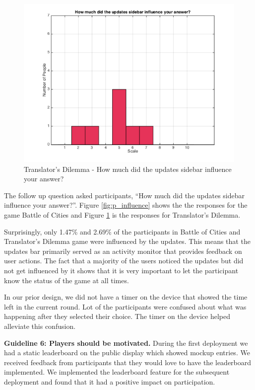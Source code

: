 \documentclass{sig-alternate}
\begin{document}
\begin{figure}
	\includegraphics[width=\linewidth]{t_influence.png}
	\caption{Translator's Dilemma - How much did the updates sidebar influence your answer?}
	\label{fig:t_influence}
\end{figure}

The follow up question asked participants, ``How much did the updates sidebar influence your answer?''. Figure \ref{fig:p_influence} shows the the responses for the game Battle of Cities and Figure \ref{fig:t_influence} is the responses for Translator's Dilemma.

Surprisingly, only 1.47\% and 2.69\% of the participants in Battle of Cities and Translator's Dilemma game were influenced by the updates. This means that the updates bar primarily served as an activity monitor that provides feedback on user actions. The fact that a majority of the users noticed the updates but did not get influenced by it shows that it is very important to let the participant know the status of the game at all times.

In our prior design, we did not have a timer on the device that showed the time left in the current round. Lot of the participants were confused about what was happening after they selected their choice. The timer on the device helped alleviate this confusion.

\textbf{Guideline 6: Players should be motivated.}
During the first deployment we had a static leaderboard on the public display which showed mockup entries. We received feedback from participants that they would love to have the leaderboard implemented. We implemented the leaderboard feature for the subsequent deployment and found that it had a positive impact on participation. 
\end{document}
